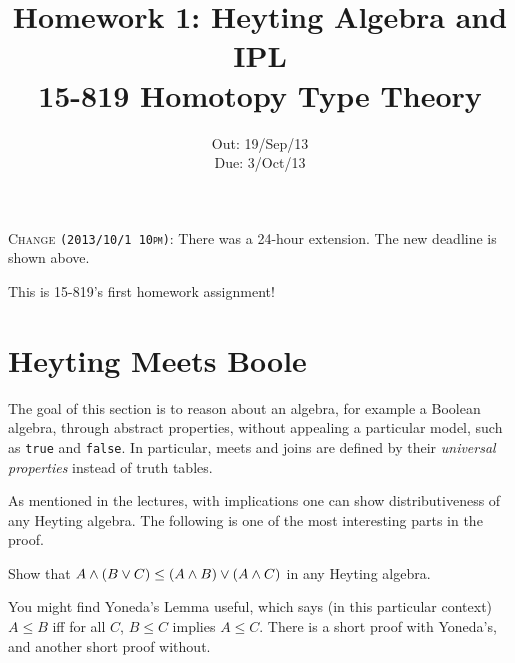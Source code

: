 \documentclass[12pt]{article}
\title{\Large\textbf{
  Homework 1: Heyting Algebra and IPL}
\normalsize\\
15-819 Homotopy Type Theory}
\author{}
\date{%
Out: 19/Sep/13\\
Due: 3/Oct/13
}
\newcommand{\showextra}[1]{\color{DarkOliveGreen}#1\normalcolor}
\begin{document}
\maketitle

\showextra{
  \begin{mdframed}[style=extra]
    \textsc{Change \texttt{(2013/10/1 10pm)}:} There was a 24-hour extension.
    The new deadline is shown above.
  \end{mdframed}
}

This is 15-819's first homework assignment!

\section{Heyting Meets Boole}

The goal of this section is to reason about an algebra,
for example a Boolean algebra,
through abstract properties,
without appealing a particular model,
such as \texttt{true} and \texttt{false}.
In particular, meets and joins are defined by their \emph{universal properties}
instead of truth tables.

As mentioned in the lectures, with implications one can show distributiveness
of any Heyting algebra.
The following is one of the most interesting parts in the proof.
\begin{task}
  Show that $A \wedge (B \vee C) \leq (A \wedge B) \vee (A \wedge C)$
  in any Heyting algebra.

  \begin{hint}
    You might find Yoneda's Lemma useful, which says (in this particular context)
    $A \leq B$ iff for all $C$, $B \leq C$ implies $A \leq C$.
    There is a short proof with Yoneda's, and another short proof without.
  \end{hint}
\end{task}
\end{document}
